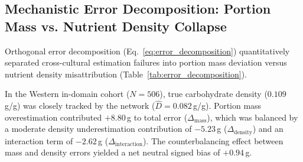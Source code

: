 \documentclass[utf8]{FrontiersinVancouver}
\begin{document}
\begin{table}[tbp]
\centering
\small
\caption{\textbf{Subgroup Audit of Carbohydrate Estimation Across South Asian Culinary Archetypes.} Analysis of 1,833 FoodBD meal images stratified by preparation style and staple composition under zero-shot transfer. Best values per column are highlighted in bold.}
\label{tab:subgroup_archetypes}
\vspace{4pt}
\end{table}

\subsection{Mechanistic Error Decomposition: Portion Mass vs. Nutrient Density Collapse}

Orthogonal error decomposition (Eq.~\ref{eq:error_decomposition}) quantitatively separated cross-cultural estimation failures into portion mass deviation versus nutrient density misattribution (Table~\ref{tab:error_decomposition}).

In the Western in-domain cohort ($N=506$), true carbohydrate density ($0.109$\,g/g) was closely tracked by the network ($\hat{D} = 0.082$\,g/g). Portion mass overestimation contributed $+8.80$\,g to total error ($\Delta_{\text{mass}}$), which was balanced by a moderate density underestimation contribution of $-5.23$\,g ($\Delta_{\text{density}}$) and an interaction term of $-2.62$\,g ($\Delta_{\text{interaction}}$). The counterbalancing effect between mass and density errors yielded a net neutral signed bias of $+0.94$\,g.
\end{document}
